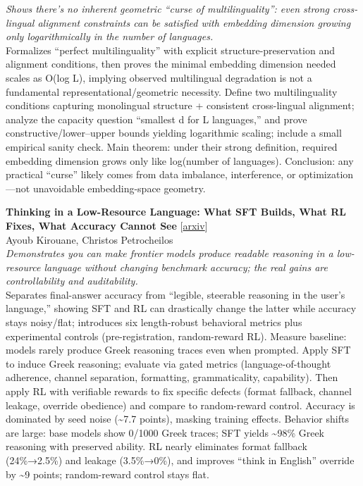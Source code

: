 \documentclass[12pt,letterpaper]{article}
\begin{document}
{\small\textit{Shows there's no inherent geometric ``curse of multilinguality'': even strong cross-lingual alignment constraints can be satisfied with embedding dimension growing only logarithmically in the number of languages.}}\\[1pt]
{\footnotesize Formalizes ``perfect multilinguality'' with explicit structure-preservation and alignment conditions, then proves the minimal embedding dimension needed scales as O(log L), implying observed multilingual degradation is not a fundamental representational/geometric necessity. Define two multilinguality conditions capturing monolingual structure + consistent cross-lingual alignment; analyze the capacity question ``smallest d for L languages,'' and prove constructive/lower--upper bounds yielding logarithmic scaling; include a small empirical sanity check. Main theorem: under their strong definition, required embedding dimension grows only like log(number of languages). Conclusion: any practical ``curse'' likely comes from data imbalance, interference, or optimization---not unavoidable embedding-space geometry.}

\medskip

{\small\textbf{Thinking in a Low-Resource Language: What SFT Builds, What RL Fixes, What Accuracy Cannot See}} {\scriptsize[\href{https://arxiv.org/abs/2608.17744}{arxiv}]}\\
{\scriptsize Ayoub Kirouane, Christos Petrocheilos}\\

{\small\textit{Demonstrates you can make frontier models produce readable reasoning in a low-resource language without changing benchmark accuracy; the real gains are controllability and auditability.}}\\[1pt]
{\footnotesize Separates final-answer accuracy from ``legible, steerable reasoning in the user's language,'' showing SFT and RL can drastically change the latter while accuracy stays noisy/flat; introduces six length-robust behavioral metrics plus experimental controls (pre-registration, random-reward RL). Measure baseline: models rarely produce Greek reasoning traces even when prompted. Apply SFT to induce Greek reasoning; evaluate via gated metrics (language-of-thought adherence, channel separation, formatting, grammaticality, capability). Then apply RL with verifiable rewards to fix specific defects (format fallback, channel leakage, override obedience) and compare to random-reward control. Accuracy is dominated by seed noise (\textasciitilde{}7.7 points), masking training effects. Behavior shifts are large: base models show 0/1000 Greek traces; SFT yields \textasciitilde{}98\% Greek reasoning with preserved ability. RL nearly eliminates format fallback (24\%→2.5\%) and leakage (3.5\%→0\%), and improves ``think in English'' override by \textasciitilde{}9 points; random-reward control stays flat.}
\end{document}
